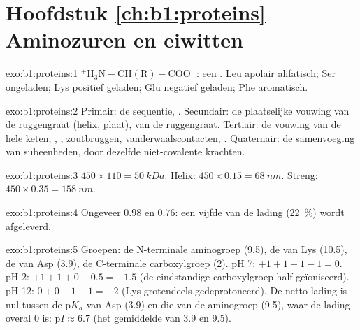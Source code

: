 \section*{Hoofdstuk \ref{ch:b1:proteins} --- Aminozuren en eiwitten}

\begin{solution}{exo:b1:proteins:1}
$\mathrm{^+H_3N{-}CH(R){-}COO^-}$: een . Leu apolair alifatisch; Ser
 ongeladen; Lys positief geladen; Glu negatief geladen; Phe aromatisch.
\end{solution}

\begin{solution}{exo:b1:proteins:2}
Primair: de sequentie, . Secundair: de plaatselijke vouwing van de
ruggengraat (helix, plaat),  van de ruggengraat. Tertiair: de
vouwing van de hele keten; , , zoutbruggen,
vanderwaalscontacten, . Quaternair: de samenvoeging van
subeenheden, door dezelfde niet-covalente krachten.
\end{solution}

\begin{solution}{exo:b1:proteins:3}
$450\times 110 = \qty{50}{kDa}$. Helix: $450\times 0.15 = \qty{68}{nm}$.
Streng: $450\times 0.35 = \qty{158}{nm}$.
\end{solution}

\begin{solution}{exo:b1:proteins:4}
Ongeveer $0.98$ en $0.76$: een vijfde van de lading (\qty{22}{\%}) wordt
afgeleverd.
\end{solution}

\begin{solution}{exo:b1:proteins:5}
Groepen: de N-terminale aminogroep (9.5), de  van Lys (10.5), de 
van Asp (3.9), de C-terminale carboxylgroep (2). pH 7: $+1 + 1 - 1 - 1 = 0$.
pH 2: $+1 + 1 + 0 - 0.5 = +1.5$ (de eindstandige carboxylgroep half geïoniseerd).
pH 12: $0 + 0 - 1 - 1 = -2$ (Lys grotendeels gedeprotoneerd). De netto lading is
nul tussen de p$K_a$ van Asp (3.9) en die van de aminogroep (9.5), waar de lading
overal $0$ is: p$I \approx 6.7$ (het gemiddelde van 3.9 en 9.5).
\end{solution}

